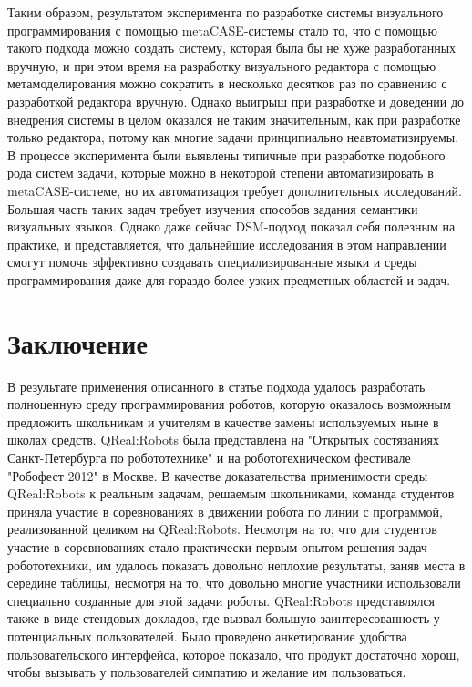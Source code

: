 \documentclass[a4paper]{article}
\begin{document}
{Таким образом, результатом эксперимента по разработке системы визуального программирования с помощью metaCASE-системы стало то, что с помощью такого подхода можно создать систему, которая была бы не хуже разработанных вручную, и при этом время на разработку визуального редактора с помощью метамоделирования можно сократить в несколько десятков раз по сравнению с разработкой редактора вручную. Однако выигрыш при разработке и доведении до внедрения системы в целом оказался не таким значительным, как при разработке только редактора, потому как многие задачи принципиально неавтоматизируемы. В процессе эксперимента были выявлены типичные при разработке подобного рода систем задачи, которые можно в некоторой степени автоматизировать в metaCASE-системе, но их автоматизация требует дополнительных исследований. Большая часть таких задач требует изучения способов задания семантики визуальных языков. Однако даже сейчас DSM-подход показал себя полезным на практике, и представляется, что дальнейшие исследования в этом направлении смогут помочь эффективно создавать специализированные языки и среды программирования даже для гораздо более узких предметных областей и задач.

\section*{Заключение}
В результате применения описанного в статье подхода удалось разработать полноценную среду программирования роботов, которую оказалось возможным предложить школьникам и учителям в качестве замены используемых ныне в школах средств. QReal:Robots была представлена на "Открытых состязаниях Санкт-Петербурга по робототехнике" и на робототехническом фестивале "Робофест 2012" в Москве. В качестве доказательства применимости среды QReal:Robots к реальным задачам, решаемым школьниками, команда студентов приняла участие в соревнованиях в движении робота по линии с программой, реализованной целиком на QReal:Robots. Несмотря на то, что для студентов участие в соревнованиях стало практически первым опытом решения задач робототехники, им удалось показать довольно неплохие результаты, заняв места в середине таблицы, несмотря на то, что довольно многие участники использовали специально созданные для этой задачи роботы. QReal:Robots представлялся также в виде стендовых докладов, где вызвал большую заинтересованность у потенциальных пользователей. Было проведено анкетирование удобства пользовательского интерфейса, которое показало, что продукт достаточно хорош, чтобы вызывать у пользователей симпатию и желание им пользоваться.

}
\end{document}
